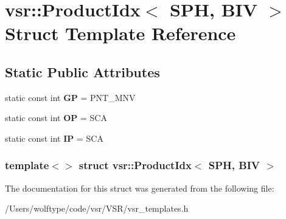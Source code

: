 \hypertarget{structvsr_1_1_product_idx_3_01_s_p_h_00_01_b_i_v_01_4}{\section{vsr\-:\-:Product\-Idx$<$ S\-P\-H, B\-I\-V $>$ Struct Template Reference}
\label{structvsr_1_1_product_idx_3_01_s_p_h_00_01_b_i_v_01_4}
}
\subsection*{Static Public Attributes}
\begin{DoxyCompactItemize}
\item 
\hypertarget{structvsr_1_1_product_idx_3_01_s_p_h_00_01_b_i_v_01_4_a4680a8c5b6f53de7e9ae8ac4684168e6}{static const int {\bfseries G\-P} = P\-N\-T\-\_\-\-M\-N\-V}\label{structvsr_1_1_product_idx_3_01_s_p_h_00_01_b_i_v_01_4_a4680a8c5b6f53de7e9ae8ac4684168e6}

\item 
\hypertarget{structvsr_1_1_product_idx_3_01_s_p_h_00_01_b_i_v_01_4_a5dedc3dff8ab3c8b81fdfdda852a9002}{static const int {\bfseries O\-P} = S\-C\-A}\label{structvsr_1_1_product_idx_3_01_s_p_h_00_01_b_i_v_01_4_a5dedc3dff8ab3c8b81fdfdda852a9002}

\item 
\hypertarget{structvsr_1_1_product_idx_3_01_s_p_h_00_01_b_i_v_01_4_a665a92a3989165e9b6a451a5eadb6b39}{static const int {\bfseries I\-P} = S\-C\-A}\label{structvsr_1_1_product_idx_3_01_s_p_h_00_01_b_i_v_01_4_a665a92a3989165e9b6a451a5eadb6b39}

\end{DoxyCompactItemize}
\subsubsection*{template$<$$>$ struct vsr\-::\-Product\-Idx$<$ S\-P\-H, B\-I\-V $>$}



The documentation for this struct was generated from the following file\-:\begin{DoxyCompactItemize}
\item 
/\-Users/wolftype/code/vsr/\-V\-S\-R/vsr\-\_\-templates.\-h\end{DoxyCompactItemize}

